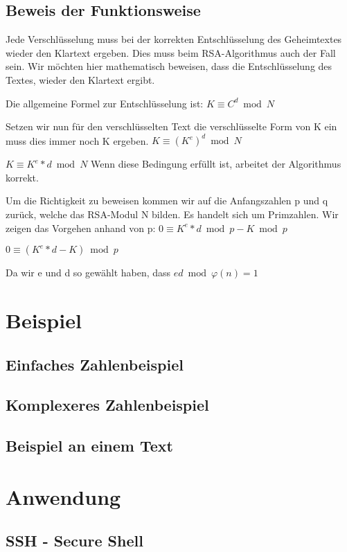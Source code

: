 \subsection{Beweis der Funktionsweise}
Jede Verschlüsselung muss bei der korrekten Entschlüsselung des Geheimtextes wieder den Klartext ergeben. Dies muss beim RSA-Algorithmus auch der Fall sein. Wir möchten hier mathematisch beweisen, dass die Entschlüsselung des Textes, wieder den Klartext ergibt.

Die allgemeine Formel zur Entschlüsselung ist:
$ K \equiv C^d \bmod N $

Setzen wir nun für den verschlüsselten Text die verschlüsselte Form von K ein muss dies immer noch K ergeben.
$ K \equiv (K^e)^d \bmod N $

$ K \equiv K^e*d \bmod N $
Wenn diese Bedingung erfüllt ist, arbeitet der Algorithmus korrekt.

Um die Richtigkeit zu beweisen kommen wir auf die Anfangszahlen p und q zurück, welche das RSA-Modul N bilden. Es handelt sich um Primzahlen. Wir zeigen das Vorgehen anhand von p:
$ 0 \equiv K^e*d \bmod p - K \bmod p $

$ 0 \equiv (K^e*d-K) \bmod p $

Da wir e und d so gewählt haben, dass 
$ ed \bmod \varphi(n) = 1 $ 


\section{Beispiel}
\subsection{Einfaches Zahlenbeispiel}
\subsection{Komplexeres Zahlenbeispiel}
\subsection{Beispiel an einem Text}
\section{Anwendung}
\subsection{SSH - Secure Shell}

